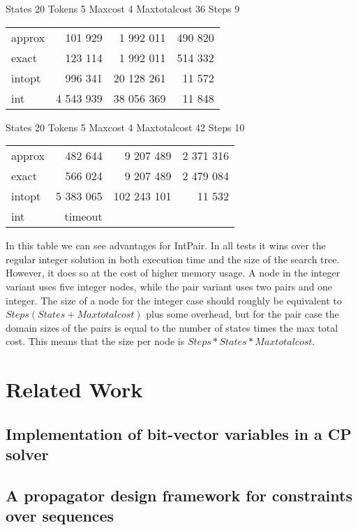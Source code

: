 \documentclass[a4paper,11pt]{article}
\begin{document}
\begin{table}
States 20 Tokens 5 Maxcost 4 Maxtotalcost 36 Steps 9 \\
\begin{tabular}{l r r r}
approx & 101 929 & 1 992 011 & 490 820 \\
exact & 123 114 & 1 992 011 & 514 332 \\
intopt & 996 341 & 20 128 261 & 11 572 \\
int & 4 543 939 & 38 056 369 & 11 848 \\
\end{tabular}
\end{table}

\begin{table}
States 20 Tokens 5 Maxcost 4 Maxtotalcost 42 Steps 10 \\
\begin{tabular}{l r r r}
approx & 482 644 & 9 207 489 & 2 371 316 \\
exact & 566 024 & 9 207 489 & 2 479 084 \\
intopt & 5 383 065 & 102 243 101 & 11 532 \\
int & timeout \\
\end{tabular}
\end{table}
In this table we can see advantages for IntPair. In all tests it wins over the regular integer solution in both execution time and the size of the search tree. However, it does so at the cost of higher memory usage. A node in the integer variant uses five integer nodes, while the pair variant uses two pairs and one integer. The size of a node for the integer case should roughly be equivalent to $Steps(States + Maxtotalcost)$ plus some overhead, but for the pair case the domain sizes of the pairs is equal to the number of states times the max total cost. This means that the size per node is $Steps*States*Maxtotalcost$.
\section{Related Work}
\subsection{Implementation of bit-vector variables in a CP solver}
\subsection{A propagator design framework for constraints over sequences}
\end{document}
